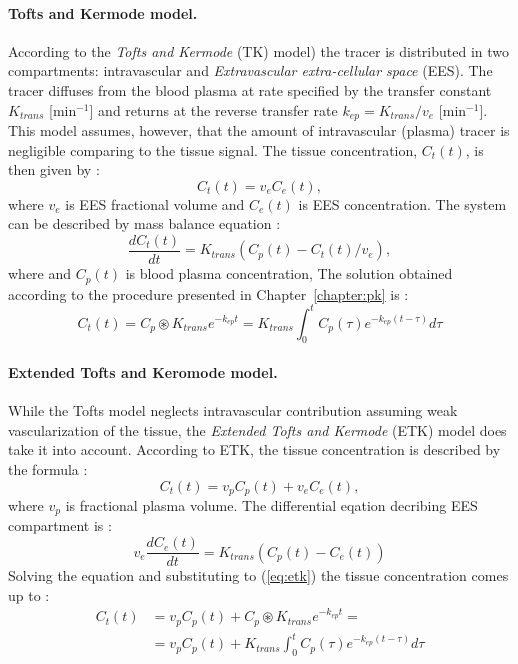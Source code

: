 \paragraph{Tofts and Kermode model.}
According to the \textit{Tofts and Kermode} (TK) model) \cite{tofts1991measurement} the tracer is distributed in two compartments: intravascular and \textit{Extravascular extra-cellular space} (EES).
The tracer diffuses from the blood plasma at rate specified by the transfer constant $K_{trans}$ [min$^{-1}$] and returns at the reverse transfer rate $k_{ep} = K_{trans}/v_e$ [min$^{-1}$]. This model assumes, however, that the amount of intravascular (plasma) tracer is negligible comparing to the tissue signal. 
The tissue concentration, $C_t(t)$, is then given by \cite{khalifa2014models}:
\begin{equation}
C_t(t) = v_eC_e(t),
\end{equation}
\noindent where $v_e$ is EES fractional volume and $C_e(t)$ is EES concentration. The system can be described by mass balance equation  \cite{khalifa2014models, tofts1999estimating}: 
\begin{equation}
	\label{eq:toft}
	\frac{dC_{t}(t)}{dt} = K_{trans}(C_p(t)-C_t(t)/v_e),
\end{equation} 
where  and $C_p(t)$ is blood plasma concentration, The solution obtained according to the procedure presented in Chapter~\ref{chapter:pk} is \cite{sourbron2011scope, khalifa2014models}:
\begin{equation}
	\label{eq:toft2}
	C_{t}(t) =C_p\circledast K_{trans}e^{-k_{ep}t} =K_{trans}\int_{0}^{t}C_p(\tau)e^{-k_{ep}(t-\tau)}d\tau  
\end{equation}
\paragraph{Extended Tofts and Keromode model.}
While the Tofts model neglects intravascular contribution assuming weak vascularization of the tissue, the \textit{Extended Tofts and Kermode} (ETK) model \cite{tofts1997modeling} does take it into account. According to ETK, the tissue concentration is described by the formula \cite{tofts2010t1, khalifa2014models}:
\begin{equation}
C_t(t) = v_pC_p(t) + v_eC_e(t),
\label{eq:etk}
\end{equation}
where $v_p$ is fractional plasma volume. The differential eqation decribing EES compartment is \cite{sourbron2011scope}:
\begin{equation}
	\label{eq:etoft}
	v_e\frac{dC_{e}(t)}{dt} = K_{trans}(C_p(t)-C_e(t))
\end{equation}
Solving the equation and substituting to (\ref{eq:etk}) the tissue concentration comes up to \cite{khalifa2014models, tofts2010t1}:
\begin{align}
	\label{eq:extended_toft}
	C_{t}(t) &=v_pC_p(t) + C_p\circledast K_{trans}e^{-k_{ep}t} =\\
	\nonumber &= v_pC_p(t)+K_{trans}\int_{0}^{t}C_p(\tau)e^{-k_{ep}(t-\tau)}d\tau 
\end{align}


